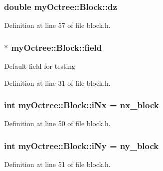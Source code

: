 \subsubsection[{dz}]{\setlength{\rightskip}{0pt plus 5cm}double my\+Octree\+::\+Block\+::dz}\label{classmy_octree_1_1_block_a5fd6660ee5d77a96782a41824a5f07f7}


Definition at line 57 of file block.\+h.

\hypertarget{classmy_octree_1_1_block_a20b33a3f7704a87de6ceec6efa98edfd}{}
\subsubsection[{field}]{$\ast$ my\+Octree\+::\+Block\+::field}\label{classmy_octree_1_1_block_a20b33a3f7704a87de6ceec6efa98edfd}
Default field for testing 

Definition at line 31 of file block.\+h.

\hypertarget{classmy_octree_1_1_block_a03e3db10912ce5033badcbf501554ba2}{}
\subsubsection[{i\+Nx}]{\setlength{\rightskip}{0pt plus 5cm}int my\+Octree\+::\+Block\+::i\+Nx = {\bf nx\+\_\+block}\hspace{0.3cm}{\ttfamily [static]}}\label{classmy_octree_1_1_block_a03e3db10912ce5033badcbf501554ba2}


Definition at line 50 of file block.\+h.

\hypertarget{classmy_octree_1_1_block_ae0b1a7bbe71892b0b4e89cfafd4b318d}{}
\subsubsection[{i\+Ny}]{\setlength{\rightskip}{0pt plus 5cm}int my\+Octree\+::\+Block\+::i\+Ny = {\bf ny\+\_\+block}\hspace{0.3cm}{\ttfamily [static]}}\label{classmy_octree_1_1_block_ae0b1a7bbe71892b0b4e89cfafd4b318d}


Definition at line 51 of file block.\+h.

